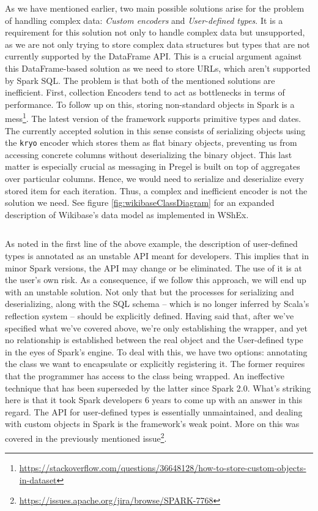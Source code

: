 As we have mentioned earlier, two main possible solutions arise for the problem of handling complex data: \textit{Custom encoders} and \textit{User-defined types}. It is a requirement for this solution not only to handle complex data but unsupported, as we are not only trying to store complex data structures but types that are not currently supported by the DataFrame API. This is a crucial argument against this DataFrame-based solution as we need to store URLs, which aren't supported by Spark SQL. The problem is that both of the mentioned solutions are inefficient. First, collection Encoders tend to act as bottlenecks in terms of performance. To follow up on this, storing non-standard objects in Spark is a mess\footnote{\url{https://stackoverflow.com/questions/36648128/how-to-store-custom-objects-in-dataset}}. The latest version of the framework supports primitive types and dates. The currently accepted solution in this sense consists of serializing objects using the \texttt{kryo} encoder which stores them as flat binary objects, preventing us from accessing concrete columns without deserializing the binary object. This last matter is especially crucial as messaging in Pregel is built on top of aggregates over particular columns. Hence, we would need to serialize and deserialize every stored item for each iteration. Thus, a  complex and inefficient encoder is not the solution we need. See figure \ref{fig:wikibaseClassDiagram} for an expanded description of Wikibase's data model as implemented in WShEx.

\begin{code}
    \inputminted{scala}{code/listings/8-1_udt.scala}
\end{code}

As noted in the first line of the above example, the description of user-defined types is annotated as an unstable API meant for developers. This implies that in minor Spark versions, the API may change or be eliminated. The use of it is at the user's own risk. As a consequence, if we follow this approach, we will end up with an unstable solution. Not only that but the processes for serializing and deserializing, along with the SQL schema -- which is no longer inferred by Scala's reflection system -- should be explicitly defined. Having said that, after we've specified what we've covered above, we're only establishing the wrapper, and yet no relationship is established between the real object and the User-defined type in the eyes of Spark's engine. To deal with this, we have two options: annotating the class we want to encapsulate or explicitly registering it. The former requires that the programmer has access to the class being wrapped. An ineffective technique that has been superseded by the latter since Spark 2.0. What's striking here is that it took Spark developers 6 years to come up with an answer in this regard. The API for user-defined types is essentially unmaintained, and dealing with custom objects in Spark is the framework's weak point. More on this was covered in the previously mentioned issue\footnote{\url{https://issues.apache.org/jira/browse/SPARK-7768}}.

